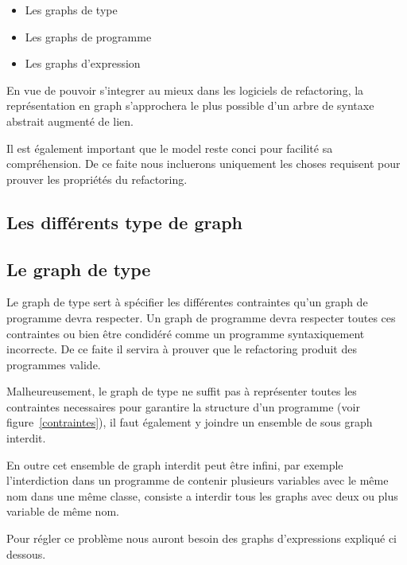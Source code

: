 \documentclass[a4paper, 12pt]{article}
\begin{document}
\begin{itemize}[label=\textbullet]
\item Les graphs de type
\item Les graphs de programme
\item Les graphs d'expression
\end{itemize}

En vue de pouvoir s'integrer au mieux dans les logiciels de refactoring, la représentation en graph s'approchera le plus possible d'un arbre de syntaxe abstrait augmenté de lien.

Il est également important que le model reste conci pour facilité sa compréhension. De ce faite nous incluerons uniquement les choses requisent pour prouver les propriétés du refactoring.

\subsection{Les différents type de graph}

\subsection{Le graph de type}

Le graph de type sert à spécifier les différentes contraintes qu'un graph de programme devra respecter. Un graph de programme devra respecter toutes ces contraintes ou bien être condidéré comme un programme syntaxiquement incorrecte. De ce faite il servira à prouver que le refactoring produit des programmes valide.

Malheureusement, le graph de type ne suffit pas à représenter toutes les contraintes necessaires pour garantire la structure d'un programme (voir figure~\ref{contraintes}), il faut également y joindre un ensemble de sous graph interdit.

En outre cet ensemble de graph interdit peut être infini, par exemple l'interdiction dans un programme de contenir plusieurs variables avec le même nom dans une même classe, consiste a interdir tous les graphs avec deux ou plus variable de même nom.

Pour régler ce problème nous auront besoin des graphs d'expressions expliqué ci dessous.\label{subsec:graphExpression}
\end{document}
